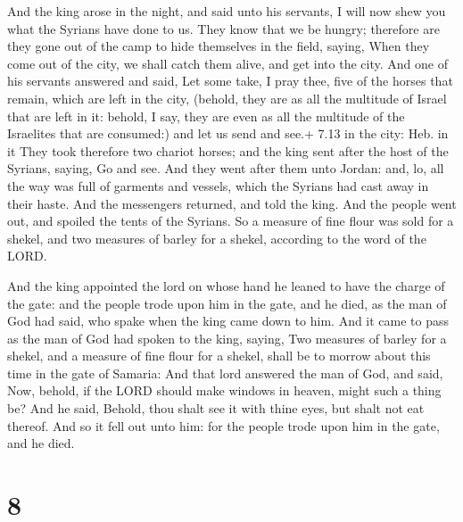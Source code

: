 And the king arose in the night, and said unto his
servants, I will now shew you what the Syrians have done to us. They
know that we be hungry; therefore are they gone out of the camp to hide
themselves in the field, saying, When they come out of the city, we
shall catch them alive, and get into the city.  And one of
his servants answered and said, Let some take, I pray thee, five of the
horses that remain, which are left in the city, (behold, they are as all
the multitude of Israel that are left in it: behold, I say, they are
even as all the multitude of the Israelites that are consumed:) and let
us send and see.+ 7.13 in the city: Heb. in it  They took
therefore two chariot horses; and the king sent after the host of the
Syrians, saying, Go and see.  And they went after them unto
Jordan: and, lo, all the way was full of garments and vessels, which the
Syrians had cast away in their haste. And the messengers returned, and
told the king.  And the people went out, and spoiled the
tents of the Syrians. So a measure of fine flour was sold for a shekel,
and two measures of barley for a shekel, according to the word of the
LORD.

 And the king appointed the lord on whose hand he leaned
to have the charge of the gate: and the people trode upon him in the
gate, and he died, as the man of God had said, who spake when the king
came down to him.  And it came to pass as the man of God
had spoken to the king, saying, Two measures of barley for a shekel, and
a measure of fine flour for a shekel, shall be to morrow about this time
in the gate of Samaria:  And that lord answered the man of
God, and said, Now, behold, if the LORD should make windows in heaven,
might such a thing be? And he said, Behold, thou shalt see it with thine
eyes, but shalt not eat thereof.  And so it fell out unto
him: for the people trode upon him in the gate, and he died.

\hypertarget{section-7}{%
\section{8}\label{section-7}}

